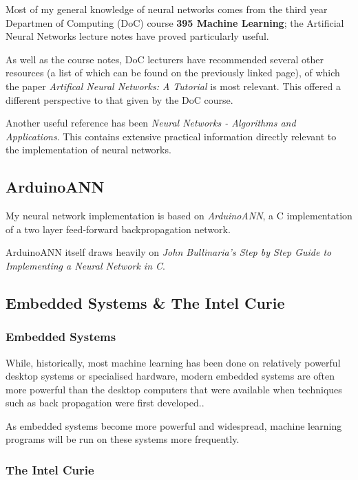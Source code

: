 \documentclass[a4paper]{article}
\begin{document}
Most of my general knowledge of neural networks comes from the third year Departmen of Computing (DoC) course \textbf{395 Machine Learning}\cite{bgref0}; the Artificial Neural Networks lecture notes have proved particularly useful.

As well as the course notes, DoC lecturers have recommended several other resources (a list of which can be found on the previously linked page), of which the paper \textit{Artifical Neural Networks: A Tutorial}\cite{bgref1} is most relevant. This offered a different perspective to that given by the DoC course.

Another useful reference has been \textit{Neural Networks - Algorithms and Applications}\cite{bgref2}. This contains extensive practical information directly relevant to the implementation of neural networks.

\subsection{ArduinoANN}%
\label{subsec:bg_arduinoann}

My neural network implementation is based on \textit{ArduinoANN}\cite{bgref3}, a C implementation of a two layer feed-forward backpropagation network. 

ArduinoANN itself draws heavily on \textit{John Bullinaria's Step by Step Guide to Implementing a Neural Network in C}\cite{bgref4}.

\subsection{Embedded Systems \& The Intel Curie}%
\label{subsec:bg_embeddedsystems}

\subsubsection{Embedded Systems}

While, historically, most machine learning has been done on relatively powerful desktop systems or specialised hardware, modern embedded systems are often more powerful than the desktop computers that were available when techniques such as back propagation were first developed.\cite{bgref5}. 

As embedded systems become more powerful and widespread, machine learning programs will be run on these systems more frequently.

\subsubsection{The Intel Curie}
\end{document}
